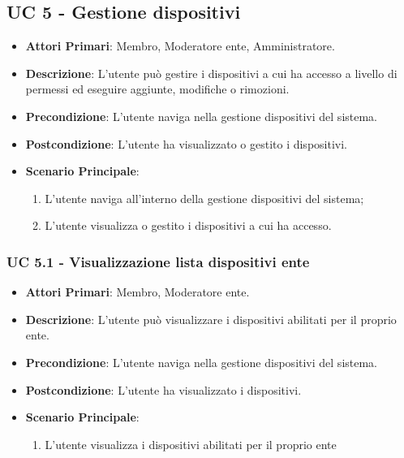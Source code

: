 	\subsection{UC 5 - Gestione dispositivi}
		
		
		\begin{itemize}
			\item \textbf{Attori Primari}: Membro, Moderatore ente, Amministratore.
			\item \textbf{Descrizione}: L'utente può gestire i dispositivi a cui ha accesso a livello di permessi ed eseguire aggiunte, modifiche o rimozioni.
			\item \textbf{Precondizione}: L'utente naviga nella gestione dispositivi del sistema.
			\item \textbf{Postcondizione}: L'utente ha visualizzato o gestito i dispositivi.
			\item \textbf{Scenario Principale}:
			\begin{enumerate}
				\item{L'utente naviga all'interno della gestione dispositivi del sistema;}
				\item{L'utente visualizza o gestito i dispositivi a cui ha accesso.}
			\end{enumerate}
		\end{itemize}
			
			
			\subsubsection{UC 5.1 - Visualizzazione lista dispositivi ente}
			\begin{itemize}
				\item \textbf{Attori Primari}: Membro, Moderatore ente.
				\item \textbf{Descrizione}: L'utente può visualizzare i dispositivi abilitati per il proprio ente.
				\item \textbf{Precondizione}: L'utente naviga nella gestione dispositivi del sistema.
				\item \textbf{Postcondizione}: L'utente ha visualizzato i dispositivi.
				\item \textbf{Scenario Principale}:
				\begin{enumerate}
					\item{L'utente visualizza i dispositivi abilitati per il proprio ente}
				\end{enumerate}
			\end{itemize}
			
